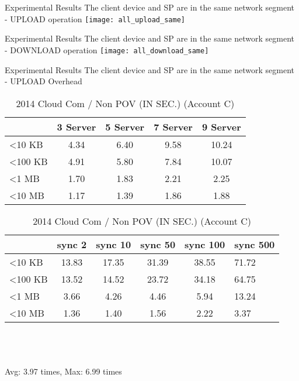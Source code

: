 \begin{frame}{Experimental Results}
{The client device and SP are in the same network segment - UPLOAD operation}
	\texttt{[image: all\_upload\_same]}
\end{frame}

\begin{frame}{Experimental Results}
{The client device and SP are in the same network segment - DOWNLOAD operation}
	\texttt{[image: all\_download\_same]}
\end{frame}

\begin{frame}{Experimental Results}
{The client device and SP are in the same network segment - UPLOAD Overhead}
	\scriptsize
    \begin{table}[]
    \centering
    \caption{My Method / Non POV (IN SEC.) (Account C)}
    \begin{tabular}{lcccc}
                         & 3 Server & 5 Server & 7 Server & 9 Server  \\ \hline
        \textless 10 KB  & 4.34 & 6.40 & 9.58 & 10.24 \\ \hline
        \textless 100 KB & 4.91 & 5.80 & 7.84 & 10.07 \\ \hline
        \textless 1 MB   & 1.70 & 1.83 & 2.21 & 2.25  \\ \hline
        \textless 10 MB  & 1.17 & 1.39 & 1.86 & 1.88  \\ \hline
    \end{tabular}
    \caption{2014 Cloud Com / Non POV (IN SEC.) (Account C)}
    \begin{tabular}{lccccl}
                         & sync 2    & sync 10   & sync 50   & sync 100 & sync 500 \\ \hline
        \textless 10 KB  & 13.83 & 17.35 & 31.39 & 38.55  & 71.72  \\ \hline
        \textless 100 KB & 13.52 & 14.52 & 23.72 & 34.18  & 64.75  \\ \hline
        \textless 1 MB   & 3.66  & 4.26  & 4.46  & 5.94   & 13.24  \\ \hline
        \textless 10 MB  & 1.36  & 1.40  & 1.56  & 2.22   & 3.37   \\ \hline
    \end{tabular}
    ~\\
    ~\\
    ~\\
    \alert{Avg: 3.97 times, Max: 6.99 times}
    \end{table}
\end{frame}

